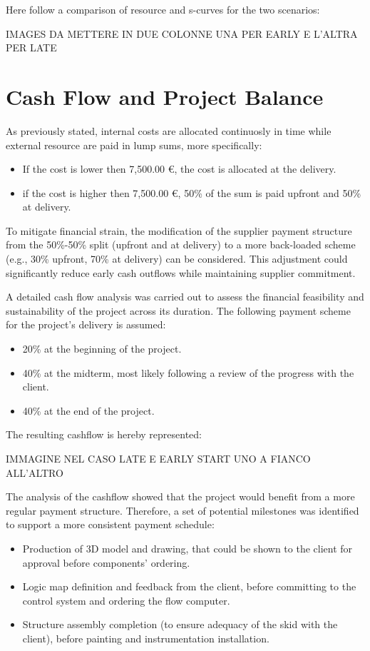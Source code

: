 \documentclass[12pt]{article}
\begin{document}
Here follow a comparison of resource and s-curves for the two scenarios:

IMAGES DA METTERE IN DUE COLONNE UNA PER EARLY E L'ALTRA PER LATE

\section{Cash Flow and Project Balance}
As previously stated, internal costs are allocated continuosly in time while external resource are paid in lump sums, more specifically:
\begin{itemize}
        \item If the cost is lower then 7,500.00 €, the cost is allocated at the delivery.
        \item if the cost is higher then 7,500.00 €, 50\% of the sum is paid upfront and 50\% at delivery.
\end{itemize}

To mitigate financial strain, the modification of the supplier payment structure from the 50\%-50\% split (upfront and at delivery) to a more back-loaded scheme (e.g., 30\% upfront, 70\% at delivery) can be considered.
This adjustment could significantly reduce early cash outflows while maintaining supplier commitment.

A detailed cash flow analysis was carried out to assess the financial feasibility and sustainability of the project across its duration. The following payment scheme for the project's delivery is assumed:
\begin{itemize}
        \item 20\% at the beginning of the project.
        \item 40\% at the midterm, most likely following a review of the progress with the client.
        \item 40\% at the end of the project.
\end{itemize}

The resulting cashflow is hereby represented:

IMMAGINE NEL CASO LATE E EARLY START UNO A FIANCO ALL'ALTRO

The analysis of the cashflow showed that the project would benefit from a more regular payment structure. Therefore, a set of potential milestones was identified to support a more consistent payment schedule:
\begin{itemize}
        \item Production of 3D model and drawing, that could be shown to the client for approval before components' ordering.
        \item Logic map definition and feedback from the client, before committing to the control system and ordering the flow computer.
        \item Structure assembly completion (to ensure adequacy of the skid with the client), before painting and instrumentation installation.
\end{itemize}
\end{document}
